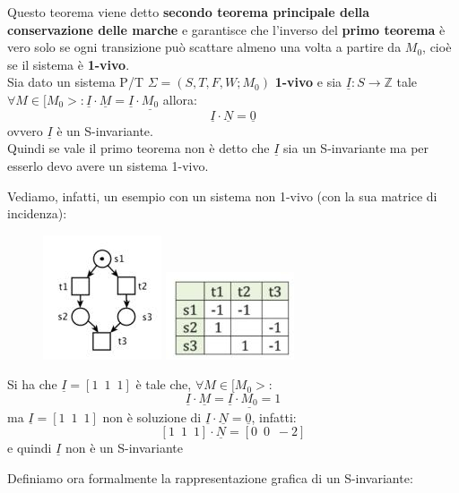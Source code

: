 \documentclass[a4paper,12pt, oneside]{book}
\begin{document}
\begin{teorema}
  Questo teorema viene detto \textbf{secondo teorema principale della
    conservazione delle marche} e garantisce che l'inverso del \textbf{primo
    teorema} è vero solo se ogni transizione può scattare almeno una volta a
  partire da $M_0$, cioè se il sistema è \textbf{1-vivo}.\\ 
  Sia dato un sistema P/T $\Sigma=(S,T,F,W;M_0)$ \textbf{1-vivo} e sia
  $\underline{I}:S\to\mathbb{Z}$ tale $\forall M\in[M_0>: \underline{I}\cdot
  \underline{M}=\underline{I}\cdot \underline{M_0}$ allora:
  \[\underline{I}\cdot \underline{N}=\underline{0}\]
  ovvero $\underline{I}$ è un S-invariante.\\
  Quindi se vale il primo teorema non è detto che $\underline{I}$ sia un
  S-invariante ma per esserlo devo avere un sistema 1-vivo.
  \newpage
  \begin{esempio}
    Vediamo, infatti, un esempio con un sistema non 1-vivo (con la sua matrice
    di incidenza):
    \begin{figure}[H]
      \centering
      \includegraphics[scale = 0.8]{img/si5.jpg}
      \includegraphics[scale = 0.8]{img/si6.jpg}
    \end{figure}
    Si ha che $\underline{I}=[1\,\,\,1\,\,\,1]$ è tale che, $\forall M\in[M_0>$:
    \[\underline{I}\cdot \underline{M}=\underline{I}\cdot\underline{M_0}=1\]
    ma $\underline{I}=[1\,\,\,1\,\,\,1]$ non è soluzione di $\underline{I}\cdot
    \underline{N}=\underline{0}$, infatti:
    \[[1\,\,\,1\,\,\,1]\cdot\underline{N}=[0\,\,\,0\,\,\,-2]\]
    e quindi $\underline{I}$ non è un S-invariante
  \end{esempio}
\end{teorema}
Definiamo ora formalmente la rappresentazione grafica di un S-invariante:
\end{document}
